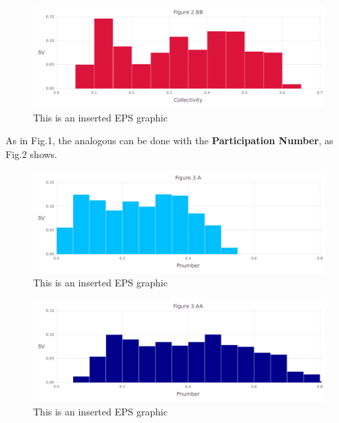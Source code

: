 \documentclass[10pt,letterpaper]{article}
\begin{document}
\begin{figure}[ht]
\begin{center}
\includegraphics[scale=0.5]{1hvr_hol/2bbfigure_very_hi-precision.pdf}
\caption{This is an inserted EPS graphic}
\label{fig6}
\end{center}
\end{figure}

\clearpage
As in Fig.1, the analogous can be done with the \textbf{Participation Number}, as Fig.2 shows.

\begin{figure}[ht]
\begin{center}
\includegraphics[scale=0.5]{1hvr_hol/3afigure_very_hi-precision.pdf}
\caption{This is an inserted EPS graphic}
\label{fig7}
\end{center}
\end{figure}

\begin{figure}[ht]
\begin{center}
\includegraphics[scale=0.5]{1hvr_hol/3aafigure_very_hi-precision.pdf}
\caption{This is an inserted EPS graphic}
\label{fig8}
\end{center}
\end{figure}
\end{document}
